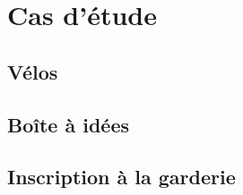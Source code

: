 \section{Cas d'étude}

\subsection{Vélos}

\subsection{Boîte à idées}

\subsection{Inscription à la garderie}
